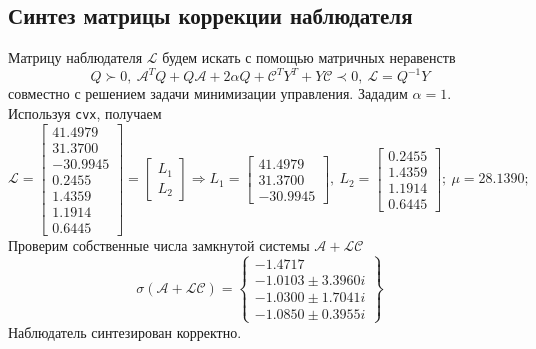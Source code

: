 \documentclass[a4paper, 12pt]{article}
\begin{document}
    \subsection{Синтез матрицы коррекции наблюдателя}
    Матрицу наблюдателя $\mathcal{L}$ будем искать с помощью матричных неравенств
    $$
    Q\succ0,\ \mathcal{A}^TQ+Q\mathcal{A}+2\alpha Q+\mathcal{C}^TY^T+Y\mathcal{C}\prec 0,\ \mathcal{L}=Q^{-1}Y
    $$
    совместно с решением задачи минимизации управления. Зададим $\alpha=1$. Используя \texttt{cvx}, получаем
    $$
    \mathcal{L}=\begin{bmatrix}
        41.4979\\
   31.3700\\
  -30.9945\\
    0.2455\\
    1.4359\\
    1.1914\\
    0.6445
    \end{bmatrix}=\begin{bmatrix}
        L_1\\L_2
    \end{bmatrix}\Rightarrow L_1=\begin{bmatrix}
        41.4979\\
   31.3700\\
  -30.9945
    \end{bmatrix},\ L_2=\begin{bmatrix}
        0.2455\\
    1.4359\\
    1.1914\\
    0.6445
    \end{bmatrix};\ \mu=28.1390;
    $$
    Проверим собственные числа замкнутой системы $\mathcal{A}+\mathcal{L}\mathcal{C}$
    $$
    \sigma\left( \mathcal{A}+\mathcal{L}\mathcal{C} \right)=\left\{\begin{matrix}
        -1.4717\\
        -1.0103 \pm 3.3960i\\
        -1.0300 \pm 1.7041i\\
        -1.0850 \pm 0.3955i
    \end{matrix}\right\}
    $$
    Наблюдатель синтезирован корректно.
\end{document}
